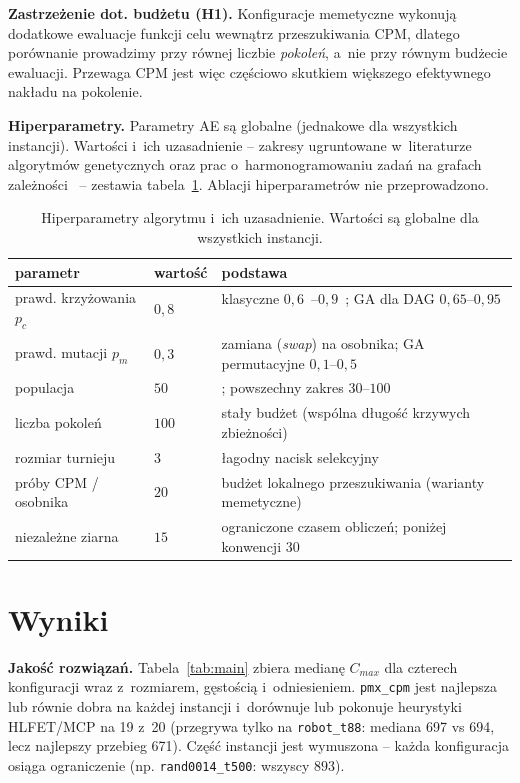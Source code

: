 \documentclass[12pt,a4paper]{article}
\newcommand{\h}[1]{\par\medskip\noindent\textbf{#1}}
\begin{document}
\h{Zastrzeżenie dot. budżetu (H1).} Konfiguracje memetyczne wykonują dodatkowe ewaluacje funkcji
celu wewnątrz przeszukiwania CPM, dlatego porównanie prowadzimy przy równej liczbie \emph{pokoleń},
a~nie przy równym budżecie ewaluacji. Przewaga CPM jest więc częściowo skutkiem większego
efektywnego nakładu na pokolenie.

\h{Hiperparametry.} Parametry AE są globalne (jednakowe dla wszystkich instancji). Wartości
i~ich uzasadnienie -- zakresy ugruntowane w~literaturze algorytmów
genetycznych oraz prac o~harmonogramowaniu zadań na grafach zależności~\cite{dejong1990,
grefenstette1986, omara2010, hou1994} -- zestawia tabela~\ref{tab:hparams}. Ablacji hiperparametrów
nie przeprowadzono.

\begin{table}[H]
\centering\footnotesize\setlength{\tabcolsep}{6pt}
\begin{tabular}{llp{8.4cm}}
\toprule
parametr & wartość & podstawa \\
\midrule
prawd. krzyżowania $p_c$ & $0{,}8$ & klasyczne $0{,}6$~\cite{dejong1990}--$0{,}9$~\cite{grefenstette1986}; GA dla DAG $0{,}65$--$0{,}95$~\cite{omara2010, hou1994} \\
prawd. mutacji $p_m$ & $0{,}3$ & zamiana (\textit{swap}) na osobnika; GA permutacyjne $0{,}1$--$0{,}5$ \\
populacja & $50$ & \cite{dejong1990}; powszechny zakres $30$--$100$ \\
liczba pokoleń & $100$ & stały budżet (wspólna długość krzywych zbieżności) \\
rozmiar turnieju & $3$ & łagodny nacisk selekcyjny~\cite{miller1995} \\
próby CPM / osobnika & $20$ & budżet lokalnego przeszukiwania (warianty memetyczne) \\
niezależne ziarna & $15$ & ograniczone czasem obliczeń; poniżej konwencji $30$ \\
\bottomrule
\end{tabular}
\caption{Hiperparametry algorytmu i~ich uzasadnienie. Wartości są globalne dla wszystkich instancji.}
\label{tab:hparams}
\end{table}

\section{Wyniki}
\label{sec:wyniki}
\textbf{Jakość rozwiązań.} Tabela~\ref{tab:main} zbiera medianę $C_{max}$ dla czterech konfiguracji
wraz z~rozmiarem, gęstością i~odniesieniem. \texttt{pmx\_cpm} jest najlepsza lub równie dobra na
każdej instancji i~dorównuje lub pokonuje heurystyki HLFET/MCP na 19 z~20 (przegrywa tylko na
\texttt{robot\_t88}: mediana 697 vs 694, lecz najlepszy przebieg 671). Część instancji jest wymuszona -- każda konfiguracja
osiąga ograniczenie (np. \texttt{rand0014\_t500}: wszyscy $893$).
\end{document}
